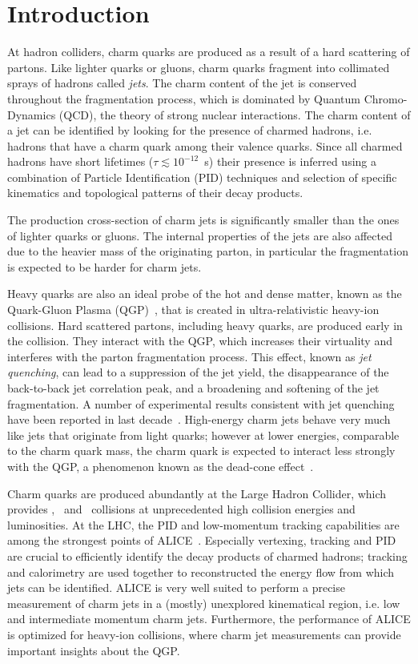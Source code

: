 \documentclass[a4paper]{jpconf}
\begin{document}
\section{Introduction}
At hadron colliders, charm quarks are produced as a result of a hard scattering of partons. Like lighter quarks or gluons, charm quarks
fragment into collimated sprays of hadrons called \emph{jets}. The charm content of the jet is conserved throughout the fragmentation process,
which is dominated by Quantum Chromo-Dynamics (QCD), the theory of strong nuclear interactions.
The charm content of a jet can be identified by looking for the presence of charmed hadrons, i.e. hadrons that have
a charm quark among their valence quarks. Since all charmed hadrons have short lifetimes ($\tau \lesssim 10^{-12}$~s) their presence is inferred
using a combination of Particle Identification (PID) techniques and selection of specific kinematics and topological patterns of their decay products.

The production cross-section of charm jets is significantly smaller than the ones of lighter quarks or gluons. The internal
properties of the jets are also affected due to the heavier mass of the originating parton, 
in particular the fragmentation is expected to be harder for charm jets.

Heavy quarks are also an ideal probe of the hot and dense matter, known as the Quark-Gluon Plasma (QGP)~\cite{STAR:2005a, PHENIX:2005a, ALICE:2010b, ALICE:2011b, CMS:2013d, ATLAS:2013c}, 
that is created in ultra-relativistic heavy-ion collisions. 
Hard scattered partons, including heavy quarks, are produced early in the collision. They interact with the QGP, which increases their virtuality and interferes with the
parton fragmentation process.
This effect, known as \emph{jet quenching}, can lead to a suppression of the jet yield, the disappearance of the back-to-back jet correlation peak,
and a broadening and softening of the jet fragmentation. 
A number of experimental results consistent with jet quenching have been reported in last decade~\cite{PHENIX:2003a, PHENIX:2008b, STAR:2003b, STAR:2003c, STAR:2006a, ALICE:2010d, CMS:2011c, CMS:2012b, ATLAS:2014d, ALICE:2015a}.
High-energy charm jets behave very much like jets that originate from light quarks; however at lower energies, comparable to the charm quark mass, the charm quark is expected
to interact less strongly with the QGP, a phenomenon known as the dead-cone effect~\cite{Dokshitzer:2001}.

Charm quarks are produced abundantly at the Large Hadron Collider, which provides \pp, \pPb\ and \PbPb\ collisions at unprecedented high collision energies and luminosities.
At the LHC, the PID and low-momentum tracking capabilities are among the strongest points of ALICE~\cite{ALICE:2014b}.
Especially vertexing, tracking and PID are crucial to efficiently identify the decay products of charmed hadrons; tracking and calorimetry are used together to reconstructed the energy flow from which jets can be identified.
ALICE is very well suited to perform a precise measurement of charm jets in a (mostly) unexplored kinematical region, i.e. low and intermediate momentum charm jets. Furthermore, the performance of ALICE
is optimized for heavy-ion collisions, where charm jet measurements can provide important insights about the QGP. 
\end{document}
